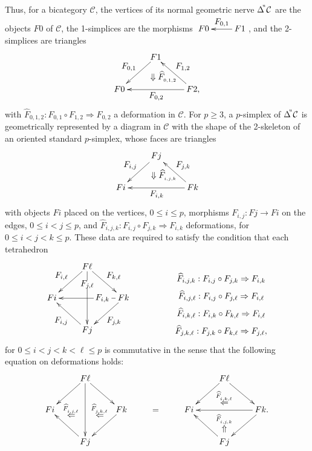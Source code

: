 \documentclass[]{amsart}
\begin{document}
Thus, for a bicategory  ${\ensuremath{\mathcal{C}}}$, the vertices of its normal geometric nerve
$\Delta^{\hspace{-2pt}^\mathrm{u}}{\ensuremath{\mathcal{C}}}$ are  the objects $F0$ of ${\ensuremath{\mathcal{C}}}$, the 1-simplices are the
morphisms $\xymatrix{F0&\ar[l]_-{\textstyle F_{0,1}}F1}$,  and the 2-simplices are triangles
$$
\xymatrix{\ar@{}[drr]|(.6)*+{\Downarrow {\textstyle \widehat{F}_{_{0,1,2}}}}  & F1 \ar[dl]_{\textstyle F_{0,1}}            \\
 F0  & &  \ar[ll]^{\textstyle F_{0,2}}    F2\ar[ul]_{\textstyle F_{1,2}}, }
$$
with $\widehat{F}_{0,1,2}:F_{0,1}\circ F_{1,2}\Rightarrow F_{0,2}$ a deformation in ${\ensuremath{\mathcal{C}}}$. For
$p\geq 3$, a $p$-simplex of $\Delta^{\hspace{-2pt}^\mathrm{u}}{\ensuremath{\mathcal{C}}}$ is geometrically represented by a
diagram in ${\ensuremath{\mathcal{C}}}$ with the shape of the 2-skeleton of an oriented standard $p$-simplex, whose faces
are triangles
$$
\xymatrix{\ar@{}[drr]|(.6)*+{\Downarrow \widehat{F}_{_{i,j,k}}}
                & Fj \ar[dl]_{\textstyle F_{i,j}}             \\
Fi  & &     Fk   \ar[ul]_{\textstyle F_{j,k}} \ar[ll]^{\textstyle F_{i,k}}     }
$$
with objects $Fi$ placed on the vertices, $0\leq i\leq p$, morphisms $F_{i,j}:Fj\rightarrow Fi$ on
the edges, $0\leq i<j\leq p$, and $\widehat{F}_{i,j,k}:F_{i,j}\circ F_{j,k}\Rightarrow F_{i,k}$
deformations, for $0\leq i<j<k\leq p$. These data are required to satisfy the condition that each
tetrahedron
$$
\begin{array}{ccc}
\xymatrix {
 & F\ell \ar[dl]_{\textstyle F_{i,\ell}}  \ar[dd]|<<<<<<{\textstyle F_{j,\ell} }\ar[dr]^{\textstyle F_{k,\ell}}& \\
Fi   & & Fk \ar[dl]^{\textstyle F_{j,k}} \ar[ll]|<<<<<<{\; \textstyle F_{i,k}\;}\\
 & Fj \ar[ul]^{\textstyle
F_{i,j}}}
 & \hspace{1cm}&
\xymatrix@R=2pt{\\  \widehat{F}_{i,j,k}:F_{i,j}\circ F_{j,k}\Rightarrow F_{i,k}\\
\widehat{F}_{i,j,\ell}:F_{i,j}\circ F_{j,\ell}\Rightarrow F_{i,\ell}\\
\widehat{F}_{i,k,\ell}:F_{i,k}\circ F_{k,\ell}\Rightarrow F_{i,\ell}\\
\widehat{F}_{j,k,\ell}:F_{j,k}\circ F_{k,\ell}\Rightarrow F_{j,\ell},}
\end{array}
$$
for $0\leq i< j< k< \ell \leq p$ is commutative in the sense that the following equation on
deformations holds:
$$
\xymatrix{&F\ell\ar[dd]\ar[rd]\ar[ld] &&&& F\ell\ar[rd]\ar[ld]\ar@{}[d]|(0.6)*+{
\overset{\widehat{F}_{_{i,k,\ell}}}\Leftarrow}&\\ Fi &\ar@{}[l]|(.4)*+{
\overset{\widehat{F}_{_{i,j,\ell}}}\Leftarrow}&Fk\ar[ld]
\ar@{}[l]|(.6)*+{ \overset{\widehat{F}_{_{j,k,\ell}}}\Leftarrow}&=&Fi&&Fk.\ar[ld]\ar[ll]\\
&Fj\ar[lu] &&&&Fj\ar[lu]\ar@{}[u]|(.6)*+{ \overset{\widehat{F}_{_{i,j,k}}}\Uparrow}&}
$$
\end{document}
